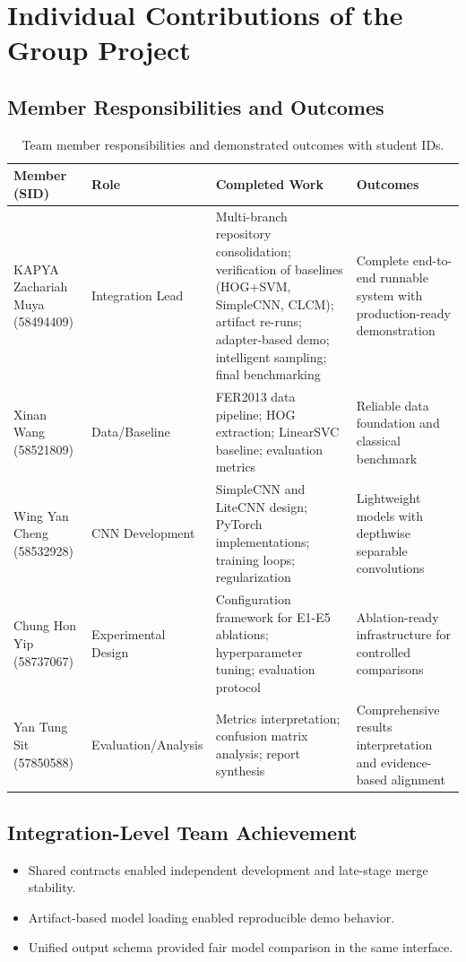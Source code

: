 \documentclass[12pt,a4paper]{article}
\begin{document}
\appendix

\section{Individual Contributions of the Group Project}

\subsection{Member Responsibilities and Outcomes}
\begin{table}[H]
\centering
\small
\begin{tabularx}{\textwidth}{@{}>{\raggedright\arraybackslash}p{3.5cm} >{\raggedright\arraybackslash}p{3cm} >{\raggedright\arraybackslash}X >{\raggedright\arraybackslash}p{3cm}@{}}
\toprule
Member (SID) & Role & Completed Work & Outcomes \\
\midrule
KAPYA Zachariah Muya (58494409) & Integration Lead & Multi-branch repository consolidation; verification of baselines (HOG+SVM, SimpleCNN, CLCM); artifact re-runs; adapter-based demo; intelligent sampling; final benchmarking & Complete end-to-end runnable system with production-ready demonstration \\
Xinan Wang (58521809) & Data/Baseline & FER2013 data pipeline; HOG extraction; LinearSVC baseline; evaluation metrics & Reliable data foundation and classical benchmark \\
Wing Yan Cheng (58532928) & CNN Development & SimpleCNN and LiteCNN design; PyTorch implementations; training loops; regularization & Lightweight models with depthwise separable convolutions \\
Chung Hon Yip (58737067) & Experimental Design & Configuration framework for E1-E5 ablations; hyperparameter tuning; evaluation protocol & Ablation-ready infrastructure for controlled comparisons \\
Yan Tung Sit (57850588) & Evaluation/Analysis & Metrics interpretation; confusion matrix analysis; report synthesis & Comprehensive results interpretation and evidence-based alignment \\
\bottomrule
\end{tabularx}
\caption{Team member responsibilities and demonstrated outcomes with student IDs.}
\label{tab:contributions}
\end{table}

\subsection{Integration-Level Team Achievement}
\begin{itemize}[leftmargin=*]
    \item Shared contracts enabled independent development and late-stage merge stability.
    \item Artifact-based model loading enabled reproducible demo behavior.
    \item Unified output schema provided fair model comparison in the same interface.
\end{itemize}
\end{document}
